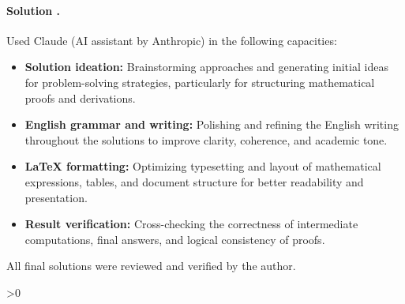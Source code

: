 \documentclass{article}
\newcounter{placeholderCount}
\newcounter{solutionCount}
\newcommand{\solution}[1]{
    \stepcounter{solutionCount}
    \paragraph{Solution \thesolutionCount.}
    {
        #1
    }
}
\begin{document}
\solution{
    Used Claude (AI assistant by Anthropic) in the following capacities:
    \begin{itemize}
        \item \textbf{Solution ideation:} Brainstorming approaches and generating initial ideas for problem-solving strategies, particularly for structuring mathematical proofs and derivations.
        \item \textbf{English grammar and writing:} Polishing and refining the English writing throughout the solutions to improve clarity, coherence, and academic tone.
        \item \textbf{\LaTeX{} formatting:} Optimizing typesetting and layout of mathematical expressions, tables, and document structure for better readability and presentation.
        \item \textbf{Result verification:} Cross-checking the correctness of intermediate computations, final answers, and logical consistency of proofs.
    \end{itemize}
    All final solutions were reviewed and verified by the author.
}

\ifnum\value{placeholderCount}>0
    \vfill
    \begin{center}
        \color{red} 
    \end{center}
\fi
\end{document}
